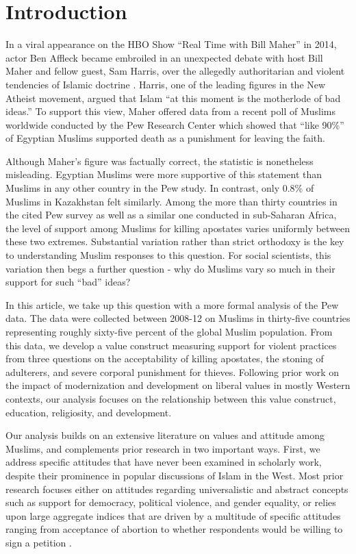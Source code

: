 \documentclass[10pt,letterpaper]{article}
\begin{document}
\linenumbers

\section*{Introduction}

In a viral appearance on the HBO Show ``Real Time with Bill Maher'' in 2014, actor Ben Affleck became embroiled in an unexpected debate with host Bill Maher and fellow guest, Sam Harris, over the allegedly authoritarian and violent tendencies of Islamic doctrine \cite{casey_real_2014}. Harris, one of the leading figures in the New Atheist movement, argued that Islam ``at this moment is the motherlode of bad ideas.'' To support this view, Maher offered data from a recent poll of Muslims worldwide conducted by the Pew Research Center which showed that ``like 90\%'' of Egyptian Muslims supported death as a punishment for leaving the faith.

Although Maher's figure was factually correct, the statistic is nonetheless misleading. Egyptian Muslims were more supportive of this statement than Muslims in any other country in the Pew study. In contrast, only 0.8\% of Muslims in Kazakhstan felt similarly. Among the more than thirty countries in the cited Pew survey as well as a similar one conducted in sub-Saharan Africa, the level of support among Muslims for killing apostates varies uniformly between these two extremes. Substantial variation rather than strict orthodoxy is the key to understanding Muslim responses to this question. For social scientists, this variation then begs a further question - why do Muslims vary so much in their support for such ``bad'' ideas?

In this article, we take up this question with a more formal analysis of the Pew data. The data were collected between 2008-12 on Muslims in thirty-five countries representing roughly sixty-five percent of the global Muslim population. From this data, we develop a value construct measuring support for violent practices from three questions on the acceptability of killing apostates, the stoning of adulterers, and severe corporal punishment for thieves. Following prior work on the impact of modernization and development on liberal values in mostly Western contexts, our analysis focuses on the relationship between this value construct, education, religiosity, and development.

Our analysis builds on an extensive literature on values and attitude among Muslims, and complements prior research in two important ways. First, we address specific attitudes that have never been examined in scholarly work, despite their prominence in popular discussions of Islam in the West. Most prior research focuses either on attitudes regarding universalistic and abstract concepts such as support for democracy, political violence, and gender equality, or relies upon large aggregate indices that are driven by a multitude of specific attitudes ranging from acceptance of abortion to whether respondents would be willing to sign a petition \cite{inglehart_worldviews_2007}.
\end{document}
